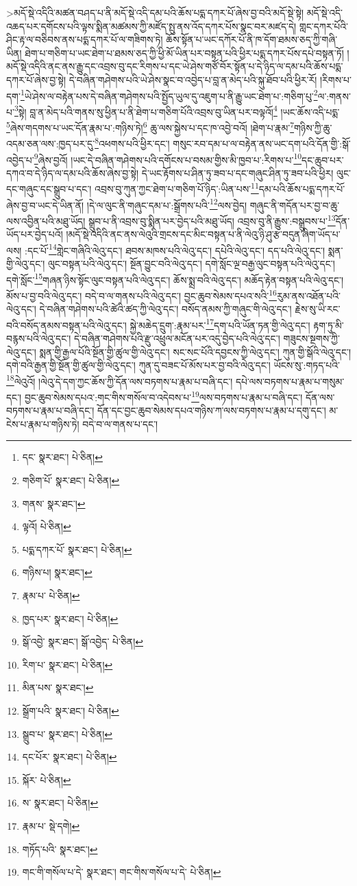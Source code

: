 >མདོ་སྡེ་འདིའི་མཚན་བཤད་པ་ནི་མདོ་སྡེ་འདི་དམ་པའི་ཆོས་པདྨ་དཀར་པོ་ཞེས་བྱ་བའི་མདོ་སྡེ་སྟེ། མདོ་སྡེ་འདི་འཆད་པར་དགོངས་པའི་ལྟས་སྨིན་མཚམས་ཀྱི་མཛོད་སྤུ་ནས་འོད་དཀར་པོས་སྣང་བར་མཛད་དེ། གླང་དཀར་པོའི་ཤིང་རྟ་ལ་བཅིབས་ནས་པདྨ་དཀར་པོ་ལ་གཟིགས་ཏེ། ཆོས་སྟོན་པ་ཡང་དཀོར་པོ་ནི་ཁ་དོག་ཐམས་ཅད་ཀྱི་གཞི་ཡིན། ཐེག་པ་གཅིག་པ་ཡང་ཐེག་པ་ཐམས་ཅད་ཀྱི་ཕྱི་མོ་ཡིན་པར་བསྟན་པའི་ཕྱིར་པདྨ་དཀར་པོས་དཔེ་བསྟན་ཏོ། །མདོ་སྡེ་འདིའི་ནང་ནས་རྒྱུ་དང་འབྲས་བུ་དང་རིགས་པ་དང་ཡེ་ཤེས་གཙོ་བོར་སྟོན་པ་དེ་ཉིད་ལ་དམ་པའི་ཆོས་པདྨ་དཀར་པོ་ཞེས་བྱ་སྟེ། དེ་བཞིན་གཤེགས་པའི་ཡེ་ཤེས་སྣང་བ་འབྱེད་པ་བླ་ན་མེད་པའི་སྐུ་ཐོབ་པའི་ཕྱིར་རོ། །རིགས་པ་དག་\footnote{དང་  སྣར་ཐང་།  པེ་ཅིན། }ཡེ་ཤེས་ལ་བརྟེན་པས་དེ་བཞིན་གཤེགས་པའི་སྤྱོད་ཡུལ་དུ་འཇུག་པ་ནི་རྒྱུ་ཡང་ཐེག་པ་:གཅིག་པུ་\footnote{གཅིག་པོ་  སྣར་ཐང་།  པེ་ཅིན། }ལ་:གནས་པ་\footnote{གནས་  སྣར་ཐང་། }སྟེ། བླ་ན་མེད་པའི་གནས་སུ་ཕྱིན་པ་ནི་ཐེག་པ་གཅིག་པོའི་འབྲས་བུ་ཡིན་པར་བལྟའོ།\footnote{ལྟའོ།  པེ་ཅིན། } །ཡང་ཆོས་འདི་པདྨ་\footnote{པདྨ་དཀར་པོ་  སྣར་ཐང་།  པེ་ཅིན། }ཞེས་གདགས་པ་ཡང་དོན་རྣམ་པ་:གཉིས་ཏེ།\footnote{གཉིས་པ།  སྣར་ཐང་། } ཆུ་ལས་སྐྱེས་པ་དང་ཁ་འབྱེ་བའོ། །ཐེག་པ་རྣམ་\footnote{རྣམ་པ་  པེ་ཅིན། }གཉིས་ཀྱི་ཆུ་འདམ་ཅན་ལས་:ཁྱད་པར་དུ་\footnote{ཁྱད་པར་  སྣར་ཐང་།  པེ་ཅིན། }འཕགས་པའི་ཕྱིར་དང་། གསུང་རབ་དམ་པ་ལ་བརྟེན་ནས་ཡང་དག་པའི་དོན་གྱི་:སྒོ་འབྱེད་པ་\footnote{སྒོ་འབྱེ་  སྣར་ཐང་། སྒོ་འབྱེད་  པེ་ཅིན། }ཞེས་བྱའོ། །ཡང་དེ་བཞིན་གཤེགས་པའི་དགོངས་པ་བསམ་གྱིས་མི་ཁྱབ་པ་:རིགས་པ་\footnote{རིག་པ་  སྣར་ཐང་།  པེ་ཅིན། }དང་ཆུབ་པར་དཀའ་བ་དེ་ཉིད་ལ་དམ་པའི་ཆོས་ཞེས་བྱ་སྟེ། དེ་ཡང་རྟོགས་པ་ཤིན་ཏུ་ཟབ་པ་དང་གཞུང་ཤིན་ཏུ་ཟབ་པའི་ཕྱིར། ལུང་དང་གཞུང་དང་སྒྲུབ་པ་དང་། འབྲས་བུ་ཀུན་ཀྱང་ཐེག་པ་གཅིག་པོ་ཉིད་:ཡིན་པས་\footnote{མིན་པས་  སྣར་ཐང་། }དམ་པའི་ཆོས་པདྨ་དཀར་པོ་ཞེས་བྱ་བ་ཡང་དེ་ཡིན་ནོ། །དེ་ལ་ལུང་ནི་གཞུང་དམ་པ་:སྒྲོགས་པའི་\footnote{སྒྲོག་པའི་  སྣར་ཐང་།  པེ་ཅིན། }ལས་བྱེད། གཞུང་ནི་གདོན་པར་བྱ་བ་ཆུ་ལས་འབྱིན་པའི་མཐུ་ཡོད། སྒྲུབ་པ་ནི་འབྲས་བུ་སྨིན་པར་བྱེད་པའི་མཐུ་ཡོད། འབྲས་བུ་ནི་རྒྱུས་:བསྒྲུབས་པ་\footnote{སྒྲུབ་པ་  སྣར་ཐང་།  པེ་ཅིན། }དོན་ཡོད་པར་བྱེད་པའོ། །མདོ་སྡེ་འདིའི་ནང་ནས་ལེའུའི་གྲངས་དང་མིང་བསྟན་པ་ནི་ལེའུ་ཉི་ཤུ་རྩ་བདུན་ཞིག་ཡོད་པ་ལས། :དང་པོ་\footnote{དང་པོར་  སྣར་ཐང་།  པེ་ཅིན། }གླེང་གཞིའི་ལེའུ་དང་། ཐབས་མཁས་པའི་ལེའུ་དང་། དཔེའི་ལེའུ་དང་། དད་པའི་ལེའུ་དང་། སྨན་གྱི་ལེའུ་དང་། ལུང་བསྟན་པའི་ལེའུ་དང་། སྔོན་བྱུང་བའི་ལེའུ་དང་། དགེ་སློང་ལྔ་བརྒྱ་ལུང་བསྟན་པའི་ལེའུ་དང་། དགེ་སློང་\footnote{སྐོར་  པེ་ཅིན། }གཞན་ཉིས་སྟོང་ལུང་བསྟན་པའི་ལེའུ་དང་། ཆོས་སྨྲ་བའི་ལེའུ་དང་། མཆོད་རྟེན་བསྟན་པའི་ལེའུ་དང་། མོས་པ་བྱ་བའི་ལེའུ་དང་། བདེ་བ་ལ་གནས་པའི་ལེའུ་དང་། བྱང་ཆུབ་སེམས་དཔའ་སའི་\footnote{ས་  སྣར་ཐང་།  པེ་ཅིན། }རུམ་ནས་འཐོན་པའི་ལེའུ་དང་། དེ་བཞིན་གཤེགས་པའི་ཚེའི་ཚད་ཀྱི་ལེའུ་དང་། བསོད་ནམས་ཀྱི་གཞུང་གི་ལེའུ་དང་། རྗེས་སུ་ཡི་རང་བའི་བསོད་ནམས་བསྟན་པའི་ལེའུ་དང་། སྐྱེ་མཆེད་དྲུག་:རྣམ་པར་\footnote{རྣམ་པ་  སྡེ་དགེ། }དག་པའི་ཡོན་ཏན་གྱི་ལེའུ་དང་། རྟག་ཏུ་མི་བརྙས་པའི་ལེའུ་དང་། དེ་བཞིན་གཤེགས་པའི་རྫུ་འཕྲུལ་མངོན་པར་འདུ་བྱེད་པའི་ལེའུ་དང་། གཟུངས་སྔགས་ཀྱི་ལེའུ་དང་། སྨན་གྱི་རྒྱལ་པོའི་སྔོན་གྱི་ཚུལ་གྱི་ལེའུ་དང་། སང་སང་པོའི་དབྱངས་ཀྱི་ལེའུ་དང་། ཀུན་གྱི་སྒོའི་ལེའུ་དང་། དགེ་བའི་རྒྱན་གྱི་སྔོན་གྱི་ཚུལ་གྱི་ལེའུ་དང་། ཀུན་དུ་བཟང་པོ་མོས་པར་བྱ་བའི་ལེའུ་དང་། ཡོངས་སུ་:གཏད་པའི་\footnote{གཏོད་པའི་  སྣར་ཐང་། }ལེའུའོ། །ལེའུ་དེ་དག་ཀྱང་ཆོས་ཀྱི་དོན་ལས་བཏགས་པ་རྣམ་པ་བཞི་དང་། དཔེ་ལས་བཏགས་པ་རྣམ་པ་གསུམ་དང་། བྱང་ཆུབ་སེམས་དཔའ་:གང་གིས་གསོལ་བ་འདེབས་པ་\footnote{གང་གི་གསོལ་པ་དེ་  སྣར་ཐང་། གང་གིས་གསོལ་པ་དེ་  པེ་ཅིན། }ལས་བཏགས་པ་རྣམ་པ་བཞི་དང་། དོན་ལས་བཏགས་པ་རྣམ་པ་བཞི་དང་། དོན་དང་བྱང་ཆུབ་སེམས་དཔའ་གཉིས་ཀ་ལས་བཏགས་པ་རྣམ་པ་དགུ་དང་། མ་ངེས་པ་རྣམ་པ་གཉིས་ཏེ། བདེ་བ་ལ་གནས་པ་དང་། 